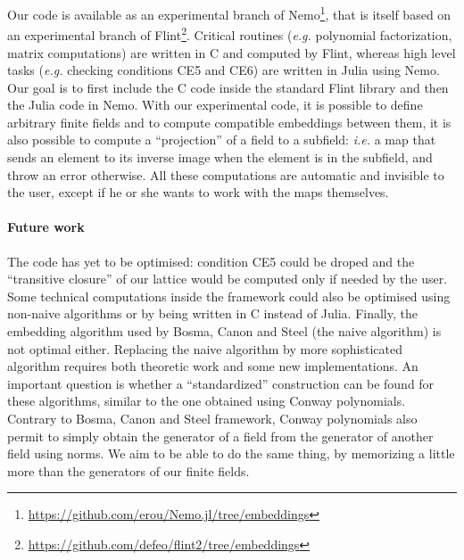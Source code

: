 \documentclass[12pt]{article}
\newcommand{\eg}{\emph{e.g. }}
\newcommand{\ie}{\emph{i.e. }}
\begin{document}
Our code is available as an experimental branch of
Nemo\footnote{\url{https://github.com/erou/Nemo.jl/tree/embeddings}}, that is
itself based on an experimental branch of
Flint\footnote{\url{https://github.com/defeo/flint2/tree/embeddings}}. Critical
routines (\eg polynomial factorization, matrix computations) are written in C and
computed by Flint, whereas high level tasks (\eg checking conditions CE5 and CE6) are
written in Julia using Nemo. Our goal is to first include the C code inside the
standard Flint library and then the Julia code in Nemo.
With our experimental code, it is possible to define arbitrary finite fields and
to compute compatible embeddings between them, it is also possible to compute a ``projection'' of a
field to a subfield: \ie a map that sends an element to its inverse image when
the element is in the subfield, and throw an error otherwise. All these
computations are automatic and invisible to the user, except if he or she wants
to work with the maps themselves.

\paragraph{Future work}

The code has yet to be optimised: condition CE5 could be droped and the
``transitive closure'' of our lattice would be computed only if needed by the
user. Some technical computations inside the framework could also be optimised
using non-naive algorithms or by being written in C instead of Julia. Finally,
the embedding algorithm used by Bosma,
Canon and Steel (the naive algorithm) is not optimal either. Replacing the naive
algorithm by more sophisticated algorithm requires both theoretic work and some
new implementations. An important question is whether a ``standardized''
construction can be found for these algorithms, similar to the one obtained
using Conway polynomials. Contrary to Bosma, Canon and Steel framework, Conway
polynomials also permit to simply obtain the generator of a field from the
generator of another field using norms. We aim to be able to do the same thing,
by memorizing a little more than the generators of our finite fields.



\end{document}
